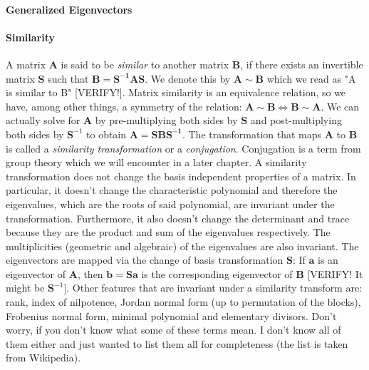 \paragraph{Generalized Eigenvectors}





\paragraph{Similarity}
A matrix $\mathbf{A}$ is said to be \emph{similar} to another matrix $\mathbf{B}$, if there exists an invertible matrix $\mathbf{S}$ such that $\mathbf{B} = \mathbf{S^{-1} A S}$. We denote this by $\mathbf{A} \sim \mathbf{B}$ which we read as "A is similar to B" [VERIFY!]. Matrix similarity is an equivalence relation, so we have, among other things, a symmetry of the relation: $\mathbf{A} \sim \mathbf{B} \Leftrightarrow \mathbf{B} \sim \mathbf{A}$. We can actually solve for $\mathbf{A}$ by pre-multiplying both sides by $\mathbf{S}$ and post-multiplying both sides by $\mathbf{S}^{-1}$ to obtain $\mathbf{A} = \mathbf{S B S^{-1}}$. The transformation that maps $\mathbf{A}$ to $\mathbf{B}$ is called a \emph{similarity transformation} or a \emph{conjugation}. Conjugation is a term from group theory which we will encounter in a later chapter. A similarity transformation does not change the basis independent properties of a matrix. In particular, it doesn't change the characteristic polynomial and therefore the eigenvalues, which are the  roots of said polynomial, are invariant under the transformation. Furthermore, it also doesn't change the determinant and trace because they are the product and sum of the eigenvalues respectively. The multiplicities (geometric and algebraic) of the eigenvalues are also invariant. The eigenvectors are mapped via the change of basis transformation $\mathbf{S}$: If $\mathbf{a}$ is an eigenvector of  $\mathbf{A}$, then $\mathbf{b} = \mathbf{S a}$ is the corresponding eigenvector of $\mathbf{B}$ [VERIFY! It might be $\mathbf{S}^{-1}$]. Other features that are invariant under a similarity transform are: rank, index of nilpotence, Jordan normal form (up to permutation of the blocks), Frobenius normal form, minimal polynomial and elementary divisors. Don't worry, if you don't know what some of these terms mean. I don't know all of them either and just wanted to list them all for completeness (the list is taken from Wikipedia).


